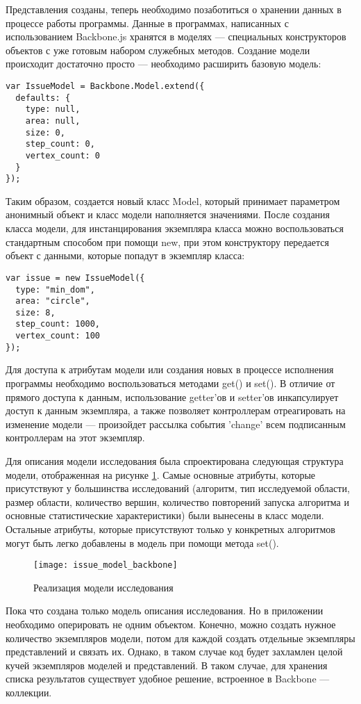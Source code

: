 Представления созданы, теперь необходимо позаботиться о хранении данных в процессе работы программы. Данные в программах, написанных с использованием Backbone.js хранятся в моделях --- специальных конструкторов объектов с уже готовым набором служебных методов. Создание модели происходит достаточно просто --- необходимо расширить базовую модель:
\begin{lstlisting}
var IssueModel = Backbone.Model.extend({
  defaults: {
    type: null,
    area: null,
    size: 0,
    step_count: 0,
    vertex_count: 0
  }
});
\end{lstlisting}
Таким образом, создается новый класс Model, который принимает параметром анонимный объект и класс модели наполняется значениями. После создания класса модели, для инстанцирования экземпляра класса можно воспользоваться стандартным способом при помощи new, при этом конструктору передается объект с данными, которые попадут в экземпляр класса:
\begin{lstlisting}
var issue = new IssueModel({
  type: "min_dom",
  area: "circle",
  size: 8,
  step_count: 1000,
  vertex_count: 100
});
\end{lstlisting}
Для доступа к атрибутам модели или создания новых в процессе исполнения программы необходимо воспользоваться методами get() и set(). В отличие от прямого доступа к данным, использование getter'ов и setter'ов инкапсулирует доступ к данным экземпляра, а также позволяет контроллерам отреагировать на изменение модели --- произойдет рассылка события 'change' всем подписанным контроллерам на этот экземпляр.

Для описания модели исследования была спроектирована следующая структура модели, отображенная на рисунке \ref{issue_model_backbone}. Самые основные атрибуты, которые присутствуют у большинства исследований (алгоритм, тип исследуемой области, размер области, количество вершин, количество повторений запуска алгоритма и основные статистические характеристики) были вынесены в класс модели. Остальные атрибуты, которые присутствуют только у конкретных алгоритмов могут быть легко добавлены в модель при помощи метода set().

\begin{figure}[ht]
\center\texttt{[image: issue\_model\_backbone]}
\caption{Реализация модели исследования}\label{issue_model_backbone}
\end{figure}

Пока что создана только модель описания исследования. Но в приложении необходимо оперировать не одним объектом. Конечно, можно создать нужное количество экземпляров модели, потом для каждой создать отдельные экземпляры представлений и связать их. Однако, в таком случае код будет захламлен целой кучей экземпляров моделей и представлений. В таком случае, для хранения списка результатов существует удобное решение, встроенное в Backbone --- коллекции.

